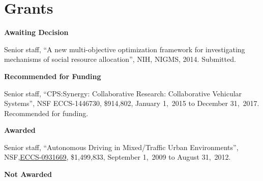 \section{Grants}

\textbf{Awaiting Decision}

\begin{bibenum}
    \item Senior staff, ``A new multi-objective optimization framework
        for investigating mechanisms of social resource allocation'',
        NIH, NIGMS, 2014. Submitted.

\end{bibenum}

\blankline

\textbf{Recommended for Funding}

\begin{bibenum}

    \item Senior staff,
        ``CPS:Synergy: Collaborative Research: Collaborative Vehicular
        Systems'', NSF ECCS-1446730, \$914,802, January 1,~2015 to
        December 31,~2017. Recommended for funding.

\end{bibenum}

\blankline

\textbf{Awarded}

\begin{bibenum}

    \item Senior staff,
        ``Autonomous Driving in Mixed\-/Traffic Urban Environments'',
        NSF,\linebreak[4]
        \href{http://www.nsf.gov/awardsearch/showAward.do?AwardNumber=0931669}{ECCS-0931669},
        \$1,499,833, September 1,~2009 to August 31,~2012.

\end{bibenum}

\blankline

\textbf{Not Awarded}

